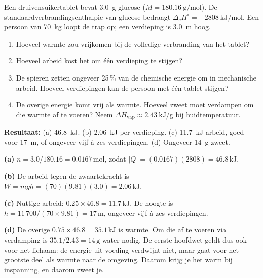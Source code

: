\begin{oefening}
Een druivensuikertablet bevat \SI{3.0}{\gram} glucose ($M = \SI{180.16}{\gram\per\mole}$). De standaardverbrandingsenthalpie van glucose bedraagt $\Delta_c H^\circ = \SI{-2808}{\kilo\joule\per\mole}$. Een persoon van \SI{70}{\kilogram} loopt de trap op; een verdieping is \SI{3.0}{\metre} hoog.
\begin{enumerate}
\item[(a)] Hoeveel warmte zou vrijkomen bij de volledige verbranding van het tablet?
\item[(b)] Hoeveel arbeid kost het om \'e\'en verdieping te stijgen?
\item[(c)] De spieren zetten ongeveer 25\,\% van de chemische energie om in mechanische arbeid. Hoeveel verdiepingen kan de persoon met \'e\'en tablet stijgen?
\item[(d)] De overige energie komt vrij als warmte. Hoeveel zweet moet verdampen om die warmte af te voeren? Neem $\Delta H_{\text{vap}} \approx \SI{2.43}{\kilo\joule\per\gram}$ bij huidtemperatuur.
\end{enumerate}
\end{oefening}
\begin{oplossing}
\textbf{Resultaat:} (a) \SI{46.8}{\kilo\joule}. (b) \SI{2.06}{\kilo\joule} per verdieping. (c) \SI{11.7}{\kilo\joule} arbeid, goed voor \SI{17}{\metre}, of ongeveer vijf \`a zes verdiepingen. (d) Ongeveer \SI{14}{\gram} zweet.

\textbf{(a)} $n = 3.0/180.16 = 0.0167\,\mathrm{mol}$, zodat $|Q| = (0.0167)(2808) = 46.8\,\mathrm{kJ}$.

\textbf{(b)} De arbeid tegen de zwaartekracht is $W = mgh = (70)(9.81)(3.0) = 2.06\,\mathrm{kJ}$.

\textbf{(c)} Nuttige arbeid: $0.25 \times 46.8 = 11.7\,\mathrm{kJ}$. De hoogte is $h = 11\,700/(70 \times 9.81) = 17\,\mathrm{m}$, ongeveer vijf \`a zes verdiepingen.

\textbf{(d)} De overige $0.75 \times 46.8 = 35.1\,\mathrm{kJ}$ is warmte. Om die af te voeren via verdamping is $35.1/2.43 = 14\,\mathrm{g}$ water nodig. De eerste hoofdwet geldt dus ook voor het lichaam: de energie uit voeding verdwijnt niet, maar gaat voor het grootste deel als warmte naar de omgeving. Daarom krijg je het warm bij inspanning, en daarom zweet je.
\end{oplossing}

